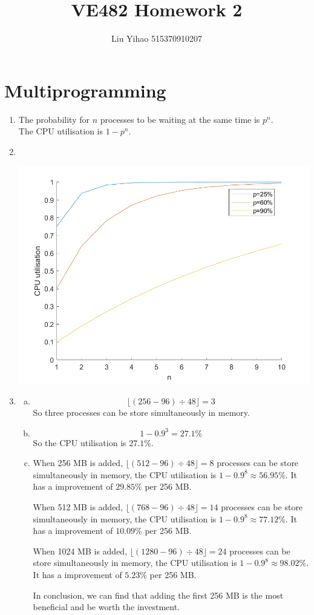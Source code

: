 \documentclass{article}
\title{VE482 Homework 2}
\author{Liu Yihao 515370910207}
\date{}
\begin{document}
\maketitle

\section{Multiprogramming}
\begin{enumerate}
\item
The probability for $n$ processes to be waiting at the same time is $p^n$.\\
The CPU utilisation is $1-p^n$.
\item \
\begin{center}
\includegraphics[width=0.8\linewidth]{ex1.png}
\end{center}
\item
\begin{enumerate}[a)]
\item
$$\lfloor(256-96)\div48\rfloor=3$$
So three processes can be store simultaneously in memory.
\item
$$1-0.9^3=27.1\%$$
So the CPU utilisation is $27.1\%$.
\item
When 256 MB is added, $\lfloor(512-96)\div48\rfloor=8$ processes can be store simultaneously in memory, the CPU utilisation is $1-0.9^8\approx56.95\%$. It has a improvement of $29.85\%$ per 256 MB.

When 512 MB is added, $\lfloor(768-96)\div48\rfloor=14$ processes can be store simultaneously in memory, the CPU utilisation is $1-0.9^8\approx77.12\%$. It has a improvement of $10.09\%$ per 256 MB.

When 1024 MB is added, $\lfloor(1280-96)\div48\rfloor=24$ processes can be store simultaneously in memory, the CPU utilisation is $1-0.9^8\approx98.02\%$. It has a improvement of $5.23\%$ per 256 MB.

In conclusion, we can find that adding the first 256 MB is the most beneficial and be worth the investment.

\end{enumerate}
\end{enumerate}
\end{document}
